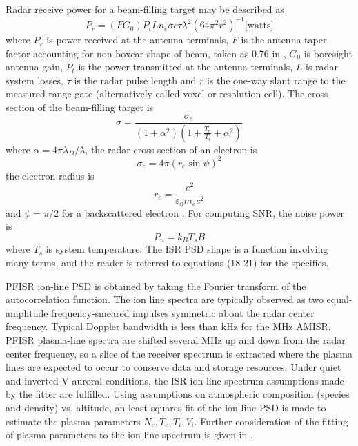 Radar receive power for a beam-filling target may be described as
\begin{equation}
P_r = (F G_0) P_t L n_e \sigma c \tau \lambda^2 (64 \pi^2 r^2)^{-1} \textrm{[watts]}
\end{equation}
where $P_r$ is power received at the antenna terminals, $F$ is the antenna taper factor accounting for non-boxcar shape of beam, taken as 0.76 in \citet{evans1969}, $G_0$ is boresight antenna gain, $P_t$ is the power transmitted at the antenna terminals, $L$ is radar system losses, $\tau$ is the radar pulse length and $r$ is the one-way slant range to the measured range gate (alternatively called voxel or resolution cell).
The cross section of the beam-filling target is \citep{nicolls2015,evans1969}
\begin{equation}
\sigma = \frac{\sigma_e}{(1+\alpha^2)(1+\frac{T_e}{T_i} + \alpha^2)}
\end{equation}
where $\alpha = 4\pi \lambda_D / \lambda$, the radar cross section of an electron is 
\begin{equation}
\sigma_e = 4 \pi(r_e \sin \psi)^2
\end{equation}
the electron radius is
\begin{equation}
r_e = \frac{e^2}{\varepsilon_0 m_e c^2}
\end{equation}
and $\psi=\pi/2$ for a backscattered electron \citep{evans1969}.
For computing SNR, the noise power is
\begin{equation}
P_n = k_B T_s B
\end{equation}
where $T_s$ is system temperature.
The ISR PSD shape is a function involving many terms, and the reader is referred to \citet{evans1969} equations (18-21) for the specifics.


PFISR ion-line PSD is obtained by taking the Fourier transform of the autocorrelation function.
The ion line spectra are typically observed as two equal-amplitude frequency-smeared impulses symmetric about the radar center frequency.
Typical Doppler bandwidth is less than \unit[25]{kHz} for the \unit[450]{MHz} AMISR.
PFISR plasma-line spectra are shifted several MHz up and down from the radar center frequency, so a slice of the receiver spectrum is extracted where the plasma lines are expected to occur to conserve data and storage resources.
Under quiet and inverted-V auroral conditions, the ISR ion-line spectrum assumptions made by the fitter are fulfilled.
Using assumptions on atmospheric composition (species and density) vs. altitude, an least squares fit of the ion-line PSD is made to estimate the plasma parameters $N_e, T_e, T_i, V_i$.
Further consideration of the fitting of plasma parameters to the ion-line spectrum is given in \citet{swobodathesis}.


